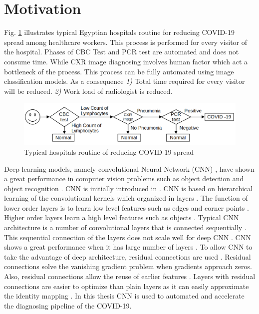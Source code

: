 \section{Motivation}
Fig. \ref{hospitalRoutine} illustrates typical Egyptian hospitals routine for reducing COVID-19 spread among healthcare workers. This process is performed for every visitor of the hospital. Phases of CBC Test and PCR test are automated and does not consume time. While CXR image diagnosing involves human factor which act a bottleneck of the process. This process can be fully automated using image classification models. As a consequence \textit{1)} Total time required for every visitor will be reduced. \textit{2)} Work load of radiologist is reduced. 

\begin{figure}%
    \centering
        \includegraphics[width=\textwidth]{Figures/HosPitalCovidRoutine.png}
        \caption{Typical hospitals routine of reducing COVID-19 spread}
        \label{hospitalRoutine}
\end{figure}

Deep learning \cite{lecun2015deep} models, namely convolutional Neural Network (CNN) \cite{lecun1989handwritten}, have shown a great performance in computer vision problems such as object detection \cite{erhan2014scalable}\cite{girshick2014rich}\cite{sermanet2013overfeat}\cite{redmon2016you} and object recognition \cite{simonyan2014very}\cite{he2016deep}. CNN is initially introduced in \cite{lecun1989handwritten}. CNN  is based on hierarchical learning of the convolutional kernels which organized in  layers \cite{krizhevsky2012imagenet}. The function of lower order layers is to learn low level features such as edges and corner points \cite{zeiler2014visualizing}. Higher order layers learn a high level features such as objects \cite{zeiler2014visualizing}. Typical CNN architecture is a number of convolutional layers that is connected sequentially \cite{simonyan2014very}. This sequential connection of the layers does not scale well for deep CNN \cite{he2016deep}. CNN shows a great performance when it has large number of layers \cite{he2016deep}. To allow CNN to take the advantage of deep architecture, residual connections are used \cite{he2016deep}. Residual connections solve the vanishing gradient problem when gradients approach zeros. Also, residual connections allow the reuse of earlier features \cite{huang2017densely}. Layers with  residual connections are easier to optimize than plain layers as it can easily approximate the identity mapping \cite{he2016deep}. In this thesis CNN is used to automated and accelerate the diagnosing pipeline of the COVID-19. 

